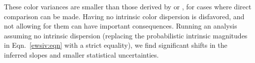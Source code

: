 \documentclass{aastex61}   	%
\begin{document}
These color variances are smaller than those derived by \citet{2003A&A...404..901N} or \citet{2007ApJ...659..122J}, for cases where direct comparison can be made.
\color{purple}
Having no intrinsic color dispersion is disfavored, and not allowing for them can have important consequences.  Running an analysis assuming no intrinsic dispersion (replacing the probabilistic intrinsic magnitudes in Eqn.~\ref{ewsiv:eqn}
with a strict equality), we find significant shifts in the inferred slopes and smaller statistical uncertainties.
\color{black}
\end{document}
